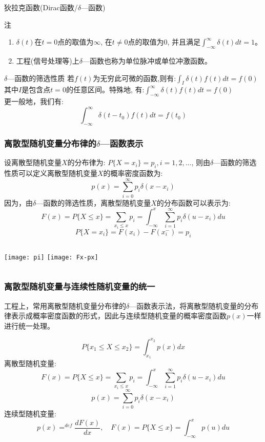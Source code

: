 \begin{frame}{狄拉克函数(Dirac函数/$\delta$---函数)}
\begin{block}{注}
\begin{enumerate}
	\item $\delta(t)$在$t=0$点的取值为$\infty$, 在$t\ne 0$点的取值为0, 并且满足$\int_{-\infty}^{\infty}\delta(t)dt=1$。
	\item 工程(信号处理等)上$\delta$---函数也称为单位脉冲或单位冲激函数。
\end{enumerate}
\end{block}
\begin{block}{$\delta$---函数的筛选性质}
若$f(t)$为无穷此可微的函数,则有:$\int_{I}\delta(t)f(t)dt=f(0) $\\
其中$I$是包含点$t=0$的任意区间。特殊地, 有:$\int_{-\infty}^{\infty}\delta(t)f(t)dt=f(0) $\\
更一般地，我们有:
$$\int_{-\infty}^{\infty}\delta(t-t_0)f(t)dt=f(t_0) $$
\end{block}
\end{frame}

\begin{frame}[shrink]
\frametitle{离散型随机变量分布律的$\delta$---函数表示}
设离散型随机变量$X$的分布律为: $P\{X=x_i\}=p_i,i=1,2,\dots$, 则由$\delta$---函数的筛选性质可以定义离散型随机变量$X$的概率密度函数为:
$$p(x)=\sum\limits_{i=0}^{\infty}p_i\delta(x-x_i)$$
因为，由$\delta$---函数的筛选性质，离散型随机变量$X$的分布函数可以表示为:
$$F(x)=P\{X\le x\}=\sum\limits_{x_i\le x}p_i=\int_{-\infty}^{x}\sum\limits_{i=1}^{\infty}p_i\delta(u-x_i)du$$
\[P\{X=x_i\}=F(x_i)-F(x_i^{-})=p_i\]
\begin{columns}
	\texttt{[image: pi]}
	\texttt{[image: Fx-px]}
\end{columns}
\end{frame}

\begin{frame}[shrink]
\frametitle{离散型随机变量与连续性随机变量的统一}
\begin{block}{}
	工程上，常用离散型随机变量分布律的$\delta$---函数表示法，将离散型随机变量的分布律表示成概率密度函数的形式，因此与连续型随机变量的概率密度函数$p(x)$一样进行统一处理。
\end{block}
$$P\{x_1\le X\le x_2\}=\int_{x_1}^{x_2}p(x)dx$$
离散型随机变量:
	$$F(x)=P\{X\le x\}=\sum\limits_{x_i\le x}p_i=\int_{-\infty}^{x}\sum\limits_{i=1}^{\infty}p_i\delta(u-x_i)du$$
	$$p(x)=\sum\limits_{i=0}^{\infty}p_i\delta(x-x_i)$$
连续型随机变量:
	$$p(x)\mathop{=}^{def}\frac{dF(x)}{dx},\quad F(x)=P\{X\le x\}=\int_{-\infty}^{x}p(u)du$$

\end{frame}

